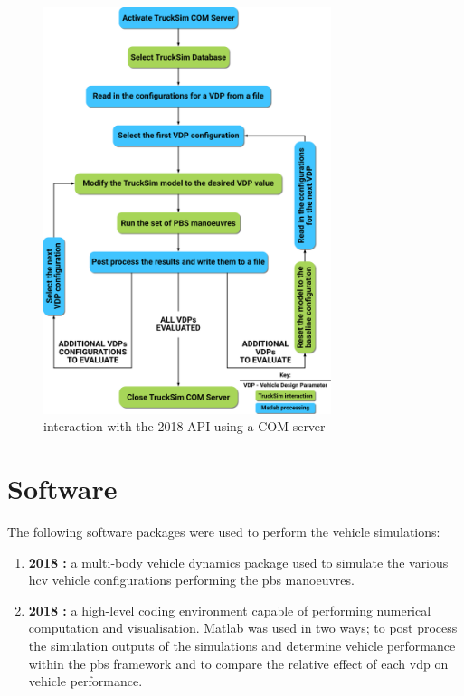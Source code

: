 \begin{figure}[H]
	\centering
	\includegraphics[width=0.75\textwidth]{fig/2018-03-23_trucksim-com-server-flowchart}
	\caption{\matlab{} interaction with the \trucksim{} 2018 API using a COM server}
	\label{figure:matlab-trucksim-api-interaction}
\end{figure}

\section{Software}\label{section:software}

The following software packages were used to perform the vehicle simulations:

\begin{enumerate}
	\item \textbf{\trucksim{} 2018 \cite{MechanicalSimulation2016}:} a multi-body vehicle dynamics package used to simulate the various \gls{hcv} vehicle configurations performing the \gls{pbs} manoeuvres.
	\item \textbf{\matlab{} 2018 \cite{MATHWORKS2015}:} a high-level coding environment capable of performing numerical computation and visualisation. Matlab was used in two ways; to post process the simulation outputs of the \trucksim{} simulations and determine vehicle performance within the \gls{pbs} framework and to compare the relative effect of each \gls{vdp} on vehicle performance.
\end{enumerate}

